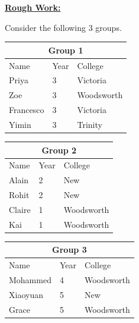 \documentclass[12pt]{article}
\begin{document}
\begin{mdframed}
    \underline{\textbf{Rough Work:}}

    \bigskip

    Consider the following 3 groups.

    \bigskip

    \begin{center}
        \centering
        \begin{tabular}{|p{2.5cm}|p{2.5cm}|p{2.5cm}|}
            \hline
            \multicolumn{3}{|c|}{\textbf{Group 1}}\\
            \hline
            Name & Year & College\\
            \hline
            Priya & 3 & Victoria\\
            \hline
            Zoe & 3 & Woodsworth\\
            \hline
            Francesco & 3 & Victoria\\
            \hline
            Yimin & 3 & Trinity\\
            \hline
        \end{tabular}

        \bigskip

        \begin{tabular}{|p{2.5cm}|p{2.5cm}|p{2.5cm}|}
            \hline
            \multicolumn{3}{|c|}{\textbf{Group 2}}\\
            \hline
            Name & Year & College\\
            \hline
            Alain & 2 & New\\
            \hline
            Rohit & 2 & New\\
            \hline
            Claire & 1 & Woodsworth\\
            \hline
            Kai & 1 & Woodsworth\\
            \hline
        \end{tabular}

        \bigskip

        \begin{tabular}{|p{2.5cm}|p{2.5cm}|p{2.5cm}|}
            \hline
            \multicolumn{3}{|c|}{\textbf{Group 3}}\\
            \hline
            Name & Year & College\\
            \hline
            Mohammed & 4 & Woodsworth\\
            \hline
            Xiaoyuan & 5 & New\\
            \hline
            Grace & 5 & Woodsworth\\
            \hline
        \end{tabular}
    \end{center}


\end{mdframed}
\end{document}

